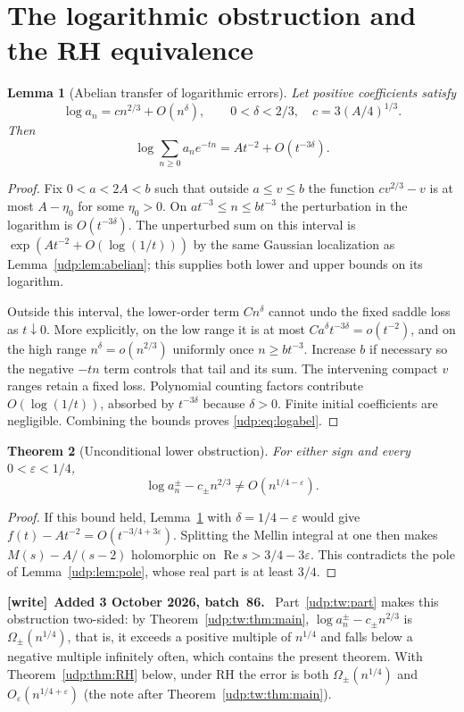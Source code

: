 \documentclass[11pt]{article}
\newtheorem{theorem}{Theorem}[section]
\newtheorem{lemma}[theorem]{Lemma}
\theoremstyle{remark}\newtheorem{remark}[theorem]{Remark}
\DeclareMathOperator{\Rea}{Re}
\newcommand{\eps}{\varepsilon}
\newenvironment{writenote}[1][]{\par\smallskip\begingroup\small
 \noindent\textbf{[write]}\if\relax\detokenize{#1}\relax\else~\textbf{#1.}\fi\ }%
 {\par\endgroup\smallskip}
\numberwithin{equation}{section}
\begin{document}
\section{The logarithmic obstruction and the RH equivalence}\label{udp:sec:RH}
\begin{lemma}[Abelian transfer of logarithmic errors]\label{udp:lem:abelianerror}
Let positive coefficients satisfy
\[
 \log a_n=cn^{2/3}+O(n^\delta),\qquad 0<\delta<2/3,
 \quad c=3(A/4)^{1/3}.
\]
Then
\begin{equation}\label{udp:eq:logabel}
 \log\sum_{n\ge0}a_ne^{-tn}=At^{-2}+O(t^{-3\delta}).
\end{equation}
\end{lemma}
\begin{proof}
Fix $0<a<2A<b$ such that outside $a\le v\le b$ the function $cv^{2/3}-v$ is at most $A-\eta_0$ for some $\eta_0>0$. On $at^{-3}\le n\le bt^{-3}$ the perturbation in the logarithm is $O(t^{-3\delta})$. The unperturbed sum on this interval is $\exp(At^{-2}+O(\log(1/t)))$ by the same Gaussian localization as Lemma~\ref{udp:lem:abelian}; this supplies both lower and upper bounds on its logarithm.

Outside this interval, the lower-order term $Cn^\delta$ cannot undo the fixed saddle loss as $t\downarrow0$. More explicitly, on the low range it is at most $Ca^\delta t^{-3\delta}=o(t^{-2})$, and on the high range $n^\delta=o(n^{2/3})$ uniformly once $n\ge bt^{-3}$. Increase $b$ if necessary so the negative $-tn$ term controls that tail and its sum. The intervening compact $v$ ranges retain a fixed loss. Polynomial counting factors contribute $O(\log(1/t))$, absorbed by $t^{-3\delta}$ because $\delta>0$. Finite initial coefficients are negligible. Combining the bounds proves \eqref{udp:eq:logabel}.
\end{proof}

\begin{theorem}[Unconditional lower obstruction]\label{udp:thm:obstruction}
For either sign and every $0<\eps<1/4$,
\[
 \log a_n^\pm-c_\pm n^{2/3}\ne O(n^{1/4-\eps}).
\]
\end{theorem}
\begin{proof}
If this bound held, Lemma~\ref{udp:lem:abelianerror} with $\delta=1/4-\eps$ would give $f(t)-At^{-2}=O(t^{-3/4+3\eps})$. Splitting the Mellin integral at one then makes $M(s)-A/(s-2)$ holomorphic on $\Rea s>3/4-3\eps$. This contradicts the pole of Lemma~\ref{udp:lem:pole}, whose real part is at least $3/4$.
\end{proof}
\begin{writenote}[Added 3 October 2026, batch~86]
Part~\ref{udp:tw:part} makes this obstruction two-sided: by
Theorem~\ref{udp:tw:thm:main}, $\log a_n^\pm-c_\pm n^{2/3}$ is
$\Omega_\pm(n^{1/4})$, that is, it exceeds a positive multiple of $n^{1/4}$
and falls below a negative multiple infinitely often, which contains the
present theorem. With Theorem~\ref{udp:thm:RH} below, under RH the error
is both $\Omega_\pm(n^{1/4})$ and $O_\eps(n^{1/4+\eps})$ (the note after
Theorem~\ref{udp:tw:thm:main}).
\end{writenote}
\end{document}
